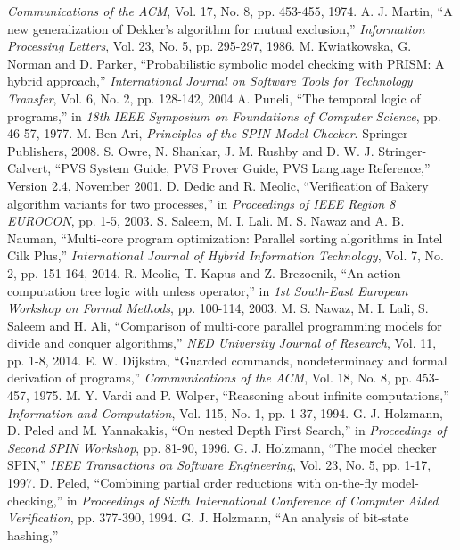 \documentclass[conference]{IEEEtran}
\begin{document}
\begin{thebibliography}{50}
\emph{Communications of the ACM}, Vol. 17, No. 8, pp. 453-455, 1974.   
 A. J. Martin, ``A new generalization of Dekker's algorithm for mutual exclusion,'' 
\emph{Information Processing Letters}, Vol. 23, No. 5, pp. 295-297, 1986. 
 M. Kwiatkowska, G. Norman and D. Parker, ``Probabilistic symbolic model checking with PRISM: A hybrid approach,'' 
\emph{International Journal on Software Tools for Technology Transfer}, Vol. 6, No. 2, pp. 128-142, 2004
 A. Puneli, ``The temporal logic of programs,'' in \emph{18th IEEE Symposium on Foundations of Computer Science}, pp. 46-57, 1977. 
 M. Ben-Ari, \emph{Principles of the SPIN Model Checker}. Springer Publishers, 2008.
 S. Owre, N. Shankar, J. M. Rushby and D. W. J. Stringer-Calvert, ``PVS System Guide, PVS Prover Guide, PVS Language Reference,''
Version 2.4, November 2001.
 D. Dedic and R. Meolic, ``Verification of Bakery algorithm variants for two processes,''
in \emph{Proceedings of IEEE Region 8 EUROCON}, pp. 1-5, 2003.
 S. Saleem, M. I. Lali. M. S. Nawaz and A. B. Nauman, ``Multi-core program optimization: Parallel sorting algorithms in Intel Cilk Plus,''
\emph{International Journal of Hybrid Information Technology}, Vol. 7, No. 2, pp. 151-164, 2014.
 R. Meolic, T. Kapus and Z. Brezocnik, ``An action computation tree logic with unless operator,'' 
in \emph{1st South-East European Workshop on Formal  Methods}, pp. 100-114, 2003.
 M. S. Nawaz, M. I. Lali, S. Saleem and H. Ali, ``Comparison of multi-core parallel programming models for divide and conquer algorithms,''
\emph{NED University Journal of Research}, Vol. 11, pp. 1-8, 2014.
 E. W. Dijkstra, ``Guarded commands, nondeterminacy and formal derivation of programs,''
\emph{Communications of the ACM}, Vol. 18, No. 8, pp. 453-457, 1975.
 M. Y. Vardi and P. Wolper, ``Reasoning about infinite computations,''
\emph{Information and Computation}, Vol. 115, No. 1, pp. 1-37, 1994.
 G. J. Holzmann, D. Peled and M. Yannakakis, ``On nested Depth First Search,'' 
in \emph{Proceedings of Second SPIN Workshop}, pp. 81-90, 1996.
 G. J. Holzmann, ``The model checker SPIN,'' \emph{IEEE Transactions on Software Engineering}, Vol. 23, No. 5, pp. 1-17, 1997.
 D. Peled, ``Combining partial order reductions with on-the-fly model-checking,'' 
in \emph{Proceedings of Sixth International Conference of Computer Aided Verification}, pp. 377-390, 1994.
 G. J. Holzmann, ``An analysis of bit-state hashing,'' 

\end{thebibliography}
\end{document}

